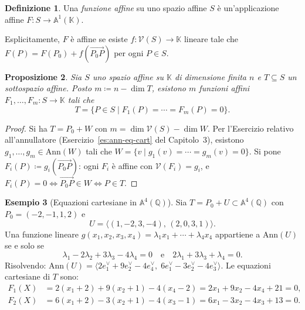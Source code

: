 \documentclass[11pt, a4paper]{book}
\theoremstyle{definition}
\newtheorem{definizione}{Definizione}[section]
\newtheorem{esempio}[definizione]{Esempio}
\theoremstyle{plain}
\newtheorem{proposizione}[definizione]{Proposizione}
\theoremstyle{remark}
\newcommand{\Q}{\mathbb{Q}}
\newcommand{\K}{\mathbb{K}}
\newcommand{\Ann}{\mathrm{Ann}}
\newcommand{\VV}{\mathcal{V}}   %
\begin{document}
\begin{defbox}
\begin{definizione}
Una \emph{funzione affine} su uno spazio affine $S$ è un'applicazione affine $F \colon S \to \mathbb{A}^1(\K)$.
\end{definizione}
\end{defbox}

Esplicitamente, $F$ è affine se esiste $f \colon \VV(S) \to \K$ lineare tale che $F(P) = F(P_0) + f(\overrightarrow{P_0P})$ per ogni $P \in S$.

\begin{proposizione}
\label{prop:eq-cartesiane}
Sia $S$ uno spazio affine su $\K$ di dimensione finita $n$ e $T \subseteq S$ un sottospazio affine. Posto $m \coloneqq n - \dim T$, esistono $m$ funzioni affini $F_1, \ldots, F_m \colon S \to \K$ tali che
\[
  T = \{ P \in S \mid F_1(P) = \cdots = F_m(P) = 0 \}.
\]
\end{proposizione}

\begin{proof}
Si ha $T = P_0 + W$ con $m = \dim \VV(S) - \dim W$. Per l'Esercizio relativo all'annullatore (Esercizio~\ref{es:ann-eq-cart} del Capitolo~3), esistono $g_1, \ldots, g_m \in \Ann(W)$ tali che $W = \{v \mid g_1(v) = \cdots = g_m(v) = 0\}$. Si pone $F_i(P) \coloneqq g_i(\overrightarrow{P_0P})$: ogni $F_i$ è affine con $\VV(F_i) = g_i$, e $F_i(P) = 0 \Leftrightarrow \overrightarrow{P_0P} \in W \Leftrightarrow P \in T$.
\end{proof}

\begin{exbox}
\begin{esempio}[Equazioni cartesiane in $\mathbb{A}^4(\Q)$]
Sia $T = P_0 + U \subset \mathbb{A}^4(\Q)$ con $P_0 = (-2,-1,1,2)$ e
\[
  U = \langle (1,-2,3,-4),\, (2,0,3,1) \rangle.
\]
Una funzione lineare $g(x_1,x_2,x_3,x_4) = \lambda_1 x_1 + \cdots + \lambda_4 x_4$ appartiene a $\Ann(U)$ se e solo se
\[
  \lambda_1 - 2\lambda_2 + 3\lambda_3 - 4\lambda_4 = 0 \quad\text{e}\quad 2\lambda_1 + 3\lambda_3 + \lambda_4 = 0.
\]
Risolvendo: $\Ann(U) = \langle 2e_1^\vee + 9e_2^\vee - 4e_4^\vee,\; 6e_1^\vee - 3e_2^\vee - 4e_3^\vee \rangle$. Le equazioni cartesiane di $T$ sono:
\begin{align*}
  F_1(X) &= 2(x_1+2) + 9(x_2+1) - 4(x_4-2) = 2x_1 + 9x_2 - 4x_4 + 21 = 0,\\
  F_2(X) &= 6(x_1+2) - 3(x_2+1) - 4(x_3-1) = 6x_1 - 3x_2 - 4x_3 + 13 = 0.
\end{align*}
\end{esempio}
\end{exbox}
\end{document}
